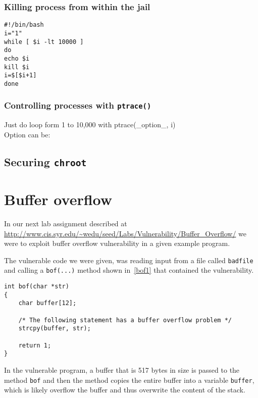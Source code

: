\documentclass[12pt, a4paper, pdflatex]{article}
\begin{document}
\subsubsection{Killing process from within the jail}
\vspace{1em}
\lstset{
  captionpos=b,
  frame=single,
  language=bash,
  breaklines=true,
  caption=Kill processes outside of chroot jail.,
  label=chroot:kill
}
\begin{lstlisting}
#!/bin/bash
i="1"
while [ $i -lt 10000 ]
do
echo $i
kill $i
i=$[$i+1]
done
\end{lstlisting}

\subsubsection{Controlling processes with \texttt{ptrace()}}
Just do loop form 1 to 10,000 with ptrace(\_option\_, i)\\
Option can be: 

\subsection{Securing \texttt{chroot}}

\section{Buffer overflow}

In our next lab assignment described at \url{http://www.cis.syr.edu/~wedu/seed/Labs/Vulnerability/Buffer_Overflow/} we were to exploit buffer overflow vulnerability in a given example program.

The vulnerable code we were given, was reading input from a file called \texttt{badfile} and calling a \texttt{bof(...)} method shown in~\ref{bof1} that contained the vulnerability.

\vspace{1em}
\lstset{
	captionpos=b,
	frame=single,
	language=C,
	breaklines=true,
	caption=Function with buffer overflow vulnerability,
	label=bof1,
}
\begin{lstlisting}
int bof(char *str)
{
	char buffer[12];

	/* The following statement has a buffer overflow problem */ 
	strcpy(buffer, str);

	return 1;
}
\end{lstlisting}
In the vulnerable program, a buffer that is 517 bytes in size is passed to the method \texttt{bof} and then the method copies the entire buffer into a variable \texttt{buffer}, which is likely overflow the buffer and thus overwrite the content of the stack.
\end{document}
